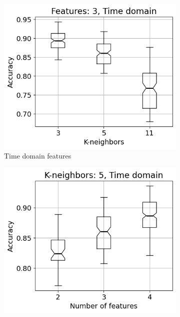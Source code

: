 \begin{figure}[h]
    \centering
    \begin{subfigure}[b]{0.48\textwidth}
        \includegraphics[width=\textwidth]{assets/results/feature-combinations/TD-3-A-True-False-F3.png}
        \caption{Time domain features}
    \end{subfigure}
    \hfill
    \begin{subfigure}[b]{0.48\textwidth}
        \includegraphics[width=\textwidth]{assets/results/feature-combinations/TD-3-A-True-False-K5.png}

\end{subfigure}
\end{figure}
